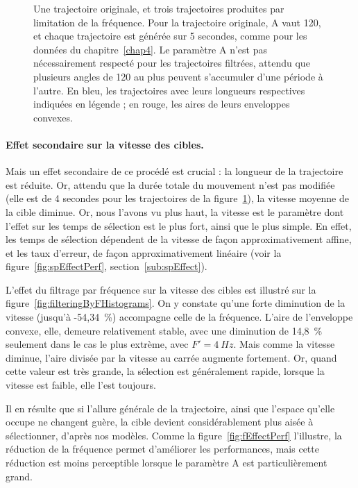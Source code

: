 \begin{figure}[!htb]
		\caption[Filtrage des trajectoires par limitation de fréquence]{Une trajectoire originale, et trois trajectoires produites par limitation de la fréquence. Pour la trajectoire originale, A vaut 120\textdegree{}, et chaque trajectoire est générée sur 5 secondes, comme pour les données du chapitre~\ref{chap4}. Le paramètre A n'est pas nécessairement respecté pour les trajectoires filtrées, attendu que plusieurs angles de 120\textdegree{} au plus peuvent s'accumuler d'une période à l'autre. En bleu, les trajectoires avec leurs longueurs respectives indiquées en légende ; en rouge, les aires de leurs enveloppes convexes.}
		\label{fig:filterF}
	\end{figure}
	
	\paragraph{Effet secondaire sur la vitesse des cibles.}
	Mais un effet secondaire de ce procédé est crucial : la longueur de la trajectoire est réduite. Or, attendu que la durée totale du mouvement n'est pas modifiée (elle est de 4 secondes pour les trajectoires de la figure~\ref{fig:filterF}), la vitesse moyenne de la cible diminue. Or, nous l'avons vu plus haut, la vitesse est le paramètre dont l'effet sur les temps de sélection est le plus fort, ainsi que le plus simple. En effet, les temps de sélection dépendent de la vitesse de façon approximativement affine, et les taux d'erreur, de façon approximativement linéaire (voir la figure~\ref{fig:spEffectPerf}, section~\ref{sub:spEffect}).
	
	L'effet du filtrage par fréquence sur la vitesse des cibles est illustré sur la figure~\ref{fig:filteringByFHistograms}. On y constate qu'une forte diminution de la vitesse (jusqu'à -54,34~\%{}) accompagne celle de la fréquence. L'aire de l'enveloppe convexe, elle, demeure relativement stable, avec une diminution de 14,8~\%{} seulement dans le cas le plus extrème, avec $F'=4~Hz$. Mais comme la vitesse diminue, l'aire divisée par la vitesse au carrée augmente fortement. Or, quand cette valeur est très grande, la sélection est généralement rapide, lorsque la vitesse est faible, elle l'est toujours.
	
	Il en résulte que si l'allure générale de la trajectoire, ainsi que l'espace qu'elle occupe ne changent guère, la cible devient considérablement plus aisée à sélectionner, d'après nos modèles. Comme la figure~\ref{fig:fEffectPerf} l'illustre, la réduction de la fréquence permet d'améliorer les performances, mais cette réduction est moins perceptible lorsque le paramètre A est particulièrement grand.

